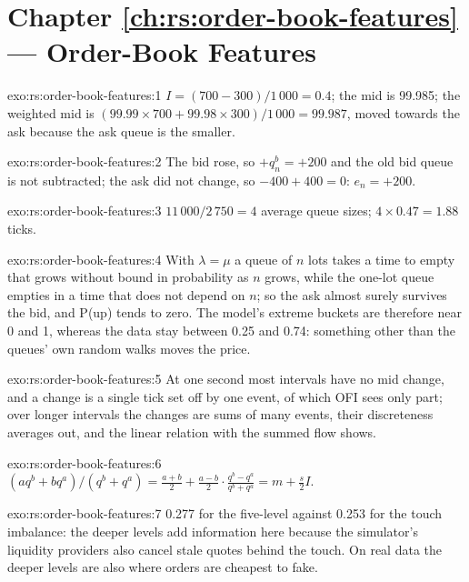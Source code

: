 \section*{Chapter \ref{ch:rs:order-book-features} --- Order-Book Features}

\begin{solution}{exo:rs:order-book-features:1}
$I = (700 - 300)/1\,000 = 0.4$; the mid is 99.985; the weighted mid is $(99.99 \times 700 + 99.98 \times 300)/1\,000 = 99.987$, moved towards
the ask because the ask queue is the smaller.
\end{solution}

\begin{solution}{exo:rs:order-book-features:2}
The bid rose, so $+q^b_n = +200$ and the old bid queue is not subtracted; the ask did not change, so $-400 + 400 = 0$: $e_n = +200$.
\end{solution}

\begin{solution}{exo:rs:order-book-features:3}
$11\,000/2\,750 = 4$ average queue sizes; $4 \times 0.47 = 1.88$ ticks.
\end{solution}

\begin{solution}{exo:rs:order-book-features:4}
With $\lambda = \mu$ a queue of $n$ lots takes a time to empty that grows without bound in probability as $n$ grows, while the one-lot queue
empties in a time that does not depend on $n$; so the ask almost surely survives the bid, and P(up) tends to zero. The model's extreme
buckets are therefore near 0 and 1, whereas the data stay between 0.25 and 0.74: something other than the queues' own random walks moves
the price.
\end{solution}

\begin{solution}{exo:rs:order-book-features:5}
At one second most intervals have no mid change, and a change is a single tick set off by one event, of which OFI sees only part; over
longer intervals the changes are sums of many events, their discreteness averages out, and the linear relation with the summed flow shows.
\end{solution}

\begin{solution}{exo:rs:order-book-features:6}
$(a q^b + b q^a)/(q^b + q^a) = \frac{a + b}{2} + \frac{a - b}{2}\cdot\frac{q^b - q^a}{q^b + q^a} = m + \frac s2 I$.
\end{solution}

\begin{solution}{exo:rs:order-book-features:7}
0.277 for the five-level  against 0.253 for the touch imbalance: the deeper levels add information here because the
simulator's liquidity providers also cancel stale quotes behind the touch. On real data the deeper levels are also where orders are
cheapest to fake.
\end{solution}

